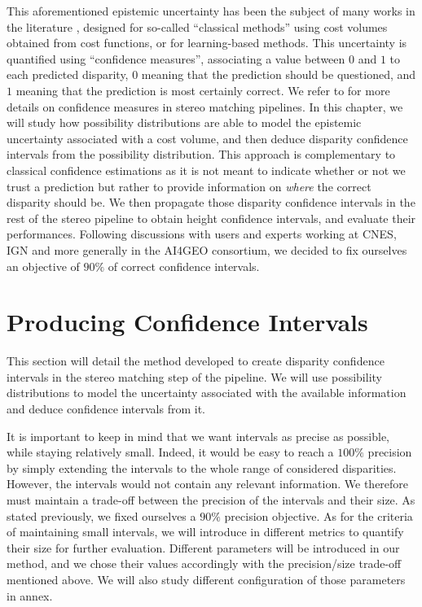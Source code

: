This aforementioned epistemic uncertainty has been the subject of many works in the literature \cite{hu_quantitative_2012,  poggi_confidence_2021,wang_uncertainty_2022}, designed for so-called ``classical methods'' using cost volumes obtained from cost functions, or for learning-based methods. This uncertainty is quantified using ``confidence measures'', associating a value between $0$ and $1$ to each predicted disparity, $0$ meaning that the prediction should be questioned,  and $1$ meaning that the prediction is most certainly correct. We refer to  for more details on confidence measures in stereo matching pipelines. In this chapter, we will study how possibility distributions are able to model the epistemic uncertainty associated with a cost volume, and then deduce disparity confidence intervals from the possibility distribution. This approach is complementary to classical confidence estimations as it is not meant to indicate whether or not we trust a prediction but rather to provide information on \textit{where} the correct disparity should be. We then propagate those disparity confidence intervals in the rest of the stereo pipeline to obtain height confidence intervals, and evaluate their performances. Following discussions with users and experts working at CNES, IGN and more generally in the AI4GEO consortium, we decided to fix ourselves an objective of $90\%$ of correct confidence intervals.

\section{Producing Confidence Intervals}
This section will detail the method developed to create disparity confidence intervals in the stereo matching step of the pipeline. We will use possibility distributions to model the uncertainty associated with the available information and deduce confidence intervals from it.

It is important to keep in mind that we want intervals as precise as possible, while staying relatively small. Indeed, it would be easy to reach a $100\%$ precision by simply extending the intervals to the whole range of considered disparities. However, the intervals would not contain any relevant information. We therefore must maintain a trade-off between the precision of the intervals and their size. As stated previously, we fixed ourselves a $90\%$ precision objective. As for the criteria of maintaining small intervals, we will introduce in  different metrics to quantify their size for further evaluation. Different parameters will be introduced in our method, and we chose their values accordingly with the precision/size trade-off mentioned above. We will also study different configuration of those parameters in annex. 

